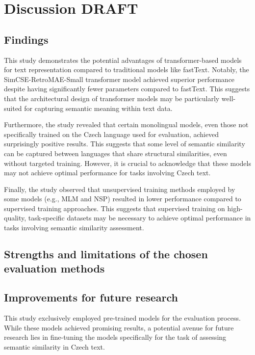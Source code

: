 
\chapter{Discussion DRAFT\label{chap:discussion}}

\section{Findings}
This study demonstrates the potential advantages of transformer-based models for text representation compared to traditional models like fastText.
Notably, the SimCSE-RetroMAE-Small transformer model achieved superior performance despite having significantly fewer parameters compared to fastText.
This suggests that the architectural design of transformer models may be particularly well-suited for capturing semantic meaning within text data.

Furthermore, the study revealed that certain monolingual models, even those not specifically trained on the Czech language used for evaluation, achieved surprisingly positive results.
This suggests that some level of semantic similarity can be captured between languages that share structural similarities, even without targeted training.
However, it is crucial to acknowledge that these models may not achieve optimal performance for tasks involving Czech text.

Finally, the study observed that unsupervised training methods employed by some models (e.g., \ac{MLM} and \ac{NSP}) resulted in lower performance compared to supervised training approaches.
This suggests that supervised training on high-quality, task-specific datasets may be necessary to achieve optimal performance in tasks involving semantic similarity assessment.


\section{Strengths and limitations of the chosen evaluation methods}

\section{Improvements for future research}
This study exclusively employed pre-trained models for the evaluation process.
While these models achieved promising results, a potential avenue for future research lies in fine-tuning the models specifically for the task of assessing semantic similarity in Czech text.



